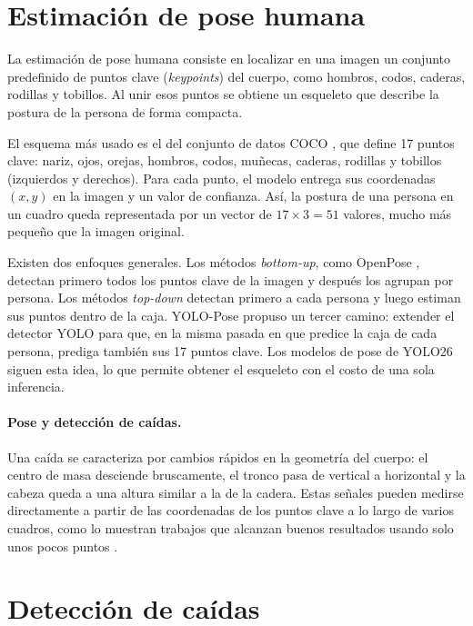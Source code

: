 \documentclass[12pt,a4paper,oneside]{book}
\theoremstyle{plain}
\theoremstyle{definition}
\theoremstyle{remark}
\begin{document}
\section{Estimación de pose humana}
\label{sec:pose}

La estimación de pose humana consiste en localizar en una imagen un conjunto predefinido de puntos clave (\textit{keypoints}) del cuerpo, como hombros, codos, caderas, rodillas y tobillos. Al unir esos puntos se obtiene un esqueleto que describe la postura de la persona de forma compacta.

El esquema más usado es el del conjunto de datos COCO \parencite{lin2014coco}, que define 17 puntos clave: nariz, ojos, orejas, hombros, codos, muñecas, caderas, rodillas y tobillos (izquierdos y derechos). Para cada punto, el modelo entrega sus coordenadas $(x, y)$ en la imagen y un valor de confianza. Así, la postura de una persona en un cuadro queda representada por un vector de $17 \times 3 = 51$ valores, mucho más pequeño que la imagen original.

Existen dos enfoques generales. Los métodos \textit{bottom-up}, como OpenPose \parencite{cao2017openpose}, detectan primero todos los puntos clave de la imagen y después los agrupan por persona. Los métodos \textit{top-down} detectan primero a cada persona y luego estiman sus puntos dentro de la caja. YOLO-Pose \parencite{maji2022yolopose} propuso un tercer camino: extender el detector YOLO para que, en la misma pasada en que predice la caja de cada persona, prediga también sus 17 puntos clave. Los modelos de pose de YOLO26 siguen esta idea, lo que permite obtener el esqueleto con el costo de una sola inferencia.

\paragraph{Pose y detección de caídas.} Una caída se caracteriza por cambios rápidos en la geometría del cuerpo: el centro de masa desciende bruscamente, el tronco pasa de vertical a horizontal y la cabeza queda a una altura similar a la de la cadera. Estas señales pueden medirse directamente a partir de las coordenadas de los puntos clave a lo largo de varios cuadros, como lo muestran trabajos que alcanzan buenos resultados usando solo unos pocos puntos \parencite{mobasheri2022fall}.

\section{Detección de caídas}
\label{sec:definicion-caida}
\end{document}
